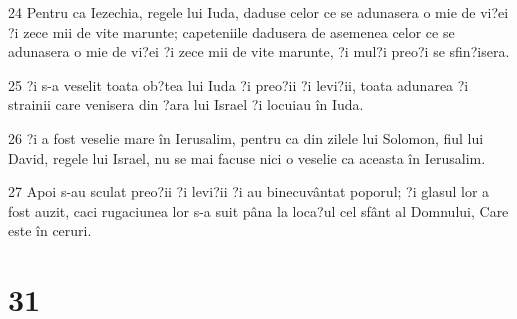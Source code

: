 \par 24 Pentru ca Iezechia, regele lui Iuda, daduse celor ce se adunasera o mie de vi?ei ?i zece mii de vite marunte; capeteniile dadusera de asemenea celor ce se adunasera o mie de vi?ei ?i zece mii de vite marunte, ?i mul?i preo?i se sfin?isera.
\par 25 ?i s-a veselit toata ob?tea lui Iuda ?i preo?ii ?i levi?ii, toata adunarea ?i strainii care venisera din ?ara lui Israel ?i locuiau în Iuda.
\par 26 ?i a fost veselie mare în Ierusalim, pentru ca din zilele lui Solomon, fiul lui David, regele lui Israel, nu se mai facuse nici o veselie ca aceasta în Ierusalim.
\par 27 Apoi s-au sculat preo?ii ?i levi?ii ?i au binecuvântat poporul; ?i glasul lor a fost auzit, caci rugaciunea lor s-a suit pâna la loca?ul cel sfânt al Domnului, Care este în ceruri.

\chapter{31}

